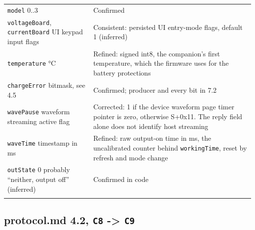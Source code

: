 {\begin{longtable}[]{@{}
  >{\raggedright\arraybackslash}p{}
  >{\raggedright\arraybackslash}p{}@{}}
\texttt{model} 0..3 & Confirmed \\
\texttt{voltageBoard}, \texttt{currentBoard} UI keypad input flags &
Consistent: persisted UI entry-mode flags, default 1 (inferred) \\
\texttt{temperature} °C & Refined: signed int8, the companion's first
temperature, which the firmware uses for the battery protections \\
\texttt{chargeError} bitmask, see 4.5 & Confirmed; producer and every
bit in 7.2 \\
\texttt{wavePause} waveform streaming active flag & Corrected: 1 if the
device waveform page timer pointer is zero, otherwise S+0x11. The reply
field alone does not identify host streaming \\
\texttt{waveTime} timestamp in ms & Refined: raw output-on time in ms,
the uncalibrated counter behind \texttt{workingTime}, reset by refresh
and mode change \\
\texttt{outState} 0 probably ``neither, output off'' (inferred) &
Confirmed in code \\*
\end{longtable}
}

\subsection{\texorpdfstring{protocol.md 4.2, \texttt{C8} -\textgreater{}
\texttt{C9}}{protocol.md 4.2, C8 -\textgreater{} C9}}\label{protocol.md-4.2-c8---c9}

